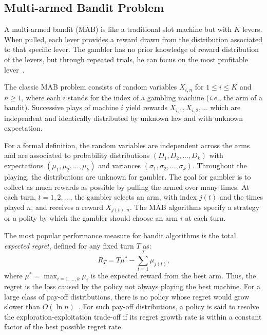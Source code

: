 \subsection{Multi-armed Bandit Problem}
A multi-armed bandit (MAB) is like a traditional slot machine but with $K$ levers. When pulled, each lever provides a reward drawn from the distribution associated to that specific lever. The gambler has no prior knowledge of reward distribution of the levers, but through repeated trials, he can focus on the most profitable lever~\citep{Mohri2005, Kuleshov2000}.

The classic MAB problem consists of random variables $X_{i,n}$ for $1\leq i\leq K$ and $n\geq 1$, where each $i$ stands for the index of a gambling machine (\textit{i.e.}, the arm of a bandit). Successive plays of machine $i$ yield rewards $X_{i,1}, X_{i,2},...$ which are independent and identically distributed by unknown law and with unknown expectation. 

For a formal definition, the random variables are independent across the arms and are associated to probability distributions $(D_1, D_2,...,D_k)$ with  expectations $(\mu_1, \mu_2,...,\mu_k)$ and variances $(\sigma_1, \sigma_2,...,\sigma_k)$. Throughout the playing, the distributions are unknown for gambler. The goal for gambler is to collect as much rewards as possible by pulling the armed over many times. At each turn, $t=1,2,...$, the gambler selects an arm, with index $j(t)$ and the times played $n$, and receives a reward $X_{j(t),n}$. The MAB algorithms specify a strategy or a polity by
which the gambler should choose an arm $i$ at each turn. 

The most popular performance measure for bandit algorithms is the total \textit{expected regret},
defined for any fixed turn $T$ as:
\begin{equation*}
    R_T = T\mu^* - \sum^T_{t=1}{\mu_{j(t)}} \text{,}
\end{equation*}
where $\mu^* = \max_{i=1,...,k}{\mu_i}$ is the expected reward from the best arm.  Thus, the regret is the loss caused by the policy not always playing the best machine. For a large class of pay-off distributions, there is no policy whose regret would grow slower than $O(\ln n)$~\citep{lai1985asymptotically}. For such pay-off distributions, a policy is said to resolve the exploration-exploitation trade-off if its regret growth rate is within a constant factor of the best possible regret rate.


